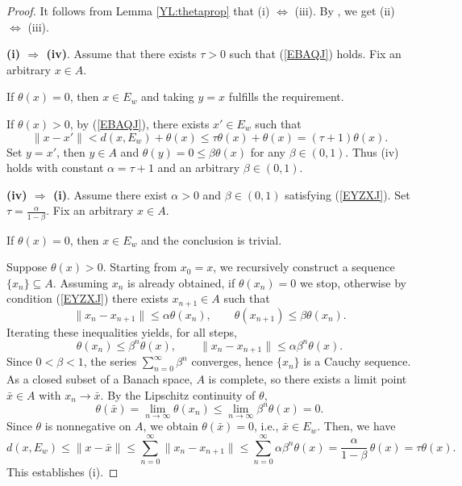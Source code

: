\documentclass[10pt,a4paper]{amsart}
\begin{document}
\begin{proof}
It follows from Lemma \ref{YL:thetaprop}     that  (i) $\Leftrightarrow$ (iii).
		By \cite[Theorem 4]{LiuNgYang2009},  we get    (ii) $\Leftrightarrow$ (iii).
	
 
	\noindent\textbf{(i) $\Rightarrow$ (iv)}.
  Assume  that   there exists $\tau>0$ such that  (\ref{EBAQJ}) holds.   
  Fix an arbitrary \(x \in A\). 
  
  If \(\theta(x) = 0\), then \(x \in E_w\) and taking \(y = x\) fulfills the requirement.
  
  If \(\theta(x) > 0\),  by   (\ref{EBAQJ}),     there exists \(x' \in E_w\) such that
  \[
  \|x - x'\| < d(x,E_w) + \theta(x) \le \tau\theta(x) + \theta(x) = (\tau+1)\theta(x).
  \]
  Set \(y = x'\),   then \(y \in A\) and \(\theta(y) = 0 \le \beta\theta(x)\) for any \(\beta \in (0,1)\). Thus (iv) holds with constant \(\alpha = \tau+1\) and an arbitrary \(\beta \in (0,1)\).
  
  
  
  	\noindent\textbf{(iv) $\Rightarrow$ (i)}.
  Assume there exist \(\alpha>0\) and \(\beta \in (0,1)\) satisfying  (\ref{EYZXJ}). Set \(\tau = \frac{\alpha}{1-\beta}\).
    Fix an arbitrary \(x \in A\). 
    
      If \(\theta(x)=0\), then \(x \in E_w\) and the conclusion is trivial. 
      
      Suppose \(\theta(x) > 0\). Starting from \(x_0 = x\), we recursively construct a sequence \(\{x_n\} \subseteq A\). 
  Assuming \(x_n\) is already obtained, if \(\theta(x_n) = 0\) we stop,  otherwise by condition (\ref{EYZXJ}) there exists \(x_{n+1} \in A\) such that
  \[
  \|x_n - x_{n+1}\| \le \alpha \theta(x_n), \qquad \theta(x_{n+1}) \le \beta \theta(x_n).
  \]
  Iterating these inequalities yields, for all steps,
  \[
  \theta(x_n) \le \beta^n \theta(x), \qquad \|x_n - x_{n+1}\| \le \alpha \beta^n \theta(x).
  \]
  Since \(0 < \beta < 1\), the series \(\sum_{n=0}^\infty \beta^n\) converges, hence \(\{x_n\}\) is a Cauchy sequence. As a closed subset of a Banach space, \(A\) is complete, so there exists a limit point \(\bar{x} \in A\) with \(x_n \to \bar{x}\). 
  By the Lipschitz continuity of \(\theta\),
  \[
  \theta(\bar{x}) = \lim_{n\to\infty} \theta(x_n) \le \lim_{n\to\infty} \beta^n \theta(x) = 0.
  \]
  Since \(\theta\) is nonnegative on \(A\), we obtain \(\theta(\bar{x}) = 0\), i.e., \(\bar{x} \in E_w\).   Then, we have
  \[ d(x,E_w) \le
  \|x - \bar{x}\| \le \sum_{n=0}^{\infty} \|x_n - x_{n+1}\|
  \le \sum_{n=0}^{\infty} \alpha \beta^n \theta(x)
  = \frac{\alpha}{1-\beta}\,\theta(x) = \tau \theta(x).
  \]
  This establishes (i).



\end{proof}
\end{document}
